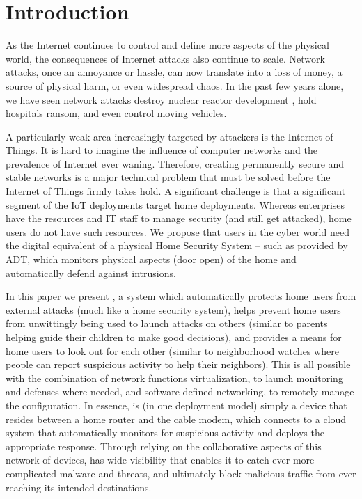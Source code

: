 \section{Introduction}
\label{sec:intro}

As the Internet continues to control and define more aspects of the physical world, the consequences of Internet attacks also continue to scale. Network attacks, once an annoyance or hassle, can now translate into a loss of money, a source of physical harm, or even widespread chaos. In the past few years alone, we have seen network attacks destroy nuclear reactor development \cite{stux}, hold hospitals ransom\cite{ransom}, and even control moving vehicles\cite{carhack}. 

A particularly weak area increasingly targeted by attackers is the Internet of Things. It is hard to imagine the influence of computer networks and the prevalence of Internet ever waning. Therefore, creating permanently secure and stable networks is a major technical problem that must be solved before the Internet of Things firmly takes hold. A significant challenge is that a significant segment of the IoT deployments target home deployments.  Whereas enterprises have the resources and IT staff to manage security (and still get attacked), home users do not have such resources.  We propose that users in the cyber world need the digital equivalent of a physical Home Security System -- such as provided by ADT, which monitors physical aspects (\eg door open) of the home and automatically defend against intrusions. 


In this paper we present \sysname, a system which automatically protects home users from external attacks (much like a home security system), helps prevent home users from unwittingly being used to launch attacks on others (similar to parents helping guide their children to make good decisions), and provides a means for home users to look out for each other (similar to neighborhood watches where people can report suspicious activity to help their neighbors).  This is all possible with the combination of network functions virtualization, to launch monitoring and defenses where needed, and software defined networking, to remotely manage the configuration.  In essence, \sysname is (in one deployment model) simply a device that resides between a home router and the cable modem, which connects to a cloud system that automatically monitors for suspicious activity and deploys the appropriate response.  Through relying on the collaborative aspects of this network of devices, \sysname has wide visibility that enables it to catch ever-more complicated malware and threats, and ultimately block malicious traffic from ever reaching its intended destinations. 

